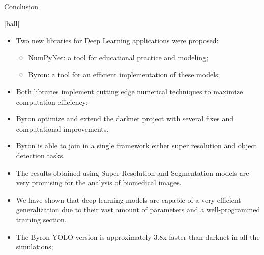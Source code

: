 \documentclass[10pt, technote, oribibl, unicode]{beamer}
\begin{document}
\begin{frame}{Conclusion}

  [ball]

  \begin{itemize}

    \item Two new libraries for Deep Learning applications were proposed:
      \begin{itemize}
        \item \textsf{NumPyNet}: a tool for educational practice and modeling;
        \item \textsf{Byron}: a tool for an efficient implementation of these models;
      \end{itemize}

    \item Both libraries implement cutting edge numerical techniques to maximize computation efficiency;

    \item \textsf{Byron} optimize and extend the \textsf{darknet} project with several fixes and computational improvements.

    \item \textsf{Byron} is able to join in a single framework either super resolution and object detection tasks.

    \item The results obtained using Super Resolution and Segmentation models are very promising for the analysis of biomedical images.

    \item We have shown that deep learning models are capable of a very efficient generalization due to their vast amount of parameters and a well-programmed training section.

    \item The \textsf{Byron} YOLO version is approximately 3.8x faster than \textsf{darknet} in all the simulations;

  \end{itemize}

\end{frame}
\end{document}
